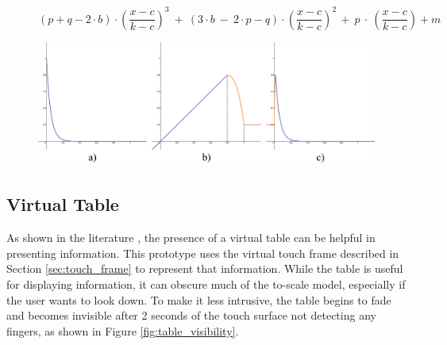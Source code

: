       \begin{figure}[h]
        \begin{equation} \label{eq:limit_poly}
        \left(p+q-2\cdot b\right)\cdot\left(\frac{x-c}{k-c}\right)^{3}\ +\ \left(3\cdot b\ -\ 2\cdot p-q\right)\cdot\left(\frac{x-c}{k-c}\right)^{2\ }+\ p\ \cdot\ \left(\frac{x-c}{k-c}\right)+m
        \end{equation}
        \end{figure}

                
        \begin{figure}[h!]
            \centering
            \includegraphics[width=1\textwidth]{figures/limit_func.png}
            \label{fig:limit_func}
        \end{figure}

    \subsection{Virtual Table} \label{sec:virtual_table}

        As shown in the literature \cite{zielaskoMenusDeskSystem2019, sousaVRRRRoomVirtualReality2017, zielaskoNonStationaryOfficeDesk2019}, the presence of a virtual table can be helpful in presenting information. This prototype uses the virtual touch frame described in Section \ref{sec:touch_frame} to represent that information. While the table is useful for displaying information, it can obscure much of the to-scale model, especially if the user wants to look down. To make it less intrusive, the table begins to fade and becomes invisible after 2 seconds of the touch surface not detecting any fingers, as shown in Figure \ref{fig:table_visibility}.


